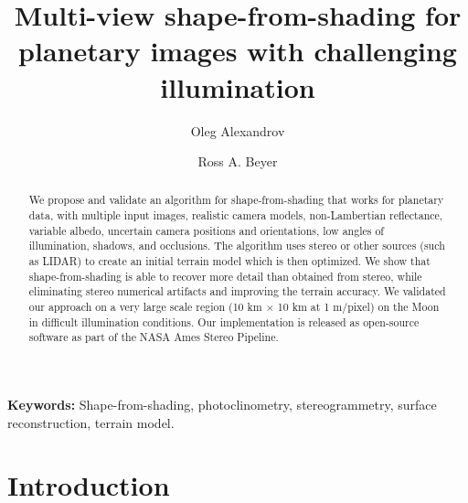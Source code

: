 \documentclass[12pt,oneside]{article}
\begin{document}
\title{Multi-view shape-from-shading for planetary images with
   challenging illumination}

 \author[1]{\rm Oleg Alexandrov}
 \author[1,2]{\rm Ross A. Beyer}



\maketitle

\begin{acronym}
\end{acronym}

\begin{abstract}
  We propose and validate an algorithm for shape-from-shading that works
  for planetary data, with multiple input images, realistic camera
  models, non-Lambertian reflectance, variable albedo, uncertain camera
  positions and orientations, low angles of illumination, shadows, and
  occlusions. The algorithm uses stereo or other sources (such as LIDAR)
  to create an initial terrain model which is then optimized. We show
  that shape-from-shading is able to recover more detail than
  obtained from stereo, while eliminating stereo numerical artifacts and
  improving the terrain accuracy. We validated our approach 
  on a very large scale region (10 km $\times$ 10 km at 1 m/pixel)
  on the Moon in difficult illumination conditions. Our implementation is released as
  open-source software as part of the NASA Ames Stereo Pipeline.
\end{abstract}

{\bf Keywords:} Shape-from-shading, photoclinometry, stereogrammetry,
surface reconstruction, terrain model.

\section{Introduction}
\end{document}
